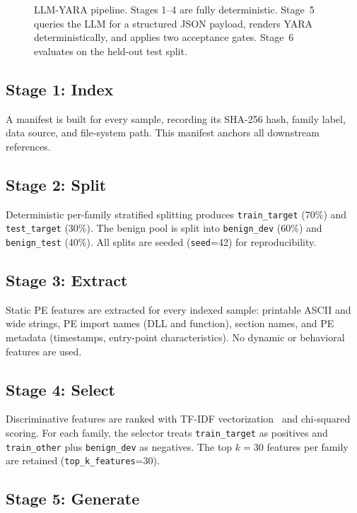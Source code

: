 \documentclass[10pt,twocolumn]{article}
\newcommand{\sysname}{\textsc{LLM-YARA}\xspace}
\begin{document}
\begin{figure}[t]
\caption{%
  \sysname pipeline.  Stages 1--4 are fully deterministic.
  Stage~5 queries the LLM for a structured JSON payload, renders
  YARA deterministically, and applies two acceptance gates.
  Stage~6 evaluates on the held-out test split.
}
\label{fig:pipeline}
\end{figure}

\subsection{Stage 1: Index}
A manifest is built for every sample, recording its SHA-256 hash,
family label, data source, and file-system path.  This manifest anchors
all downstream references.

\subsection{Stage 2: Split}
Deterministic per-family stratified splitting produces
\texttt{train\_target} (70\%) and \texttt{test\_target} (30\%).  The
benign pool is split into \texttt{benign\_dev} (60\%) and
\texttt{benign\_test} (40\%).  All splits are seeded
(\texttt{seed}=42) for reproducibility.

\subsection{Stage 3: Extract}
Static PE features are extracted for every indexed sample: printable
ASCII and wide strings, PE import names (DLL and function), section
names, and PE metadata (timestamps, entry-point characteristics).  No
dynamic or behavioral features are used.

\subsection{Stage 4: Select}
Discriminative features are ranked with TF-IDF
vectorization~\cite{salton1988tfidf} and chi-squared scoring.  For each
family, the selector treats \texttt{train\_target} as positives and
\texttt{train\_other} plus \texttt{benign\_dev} as negatives.  The top
$k=30$ features per family are retained
(\texttt{top\_k\_features}=30).

\subsection{Stage 5: Generate}
\label{sec:generate}
\end{document}
